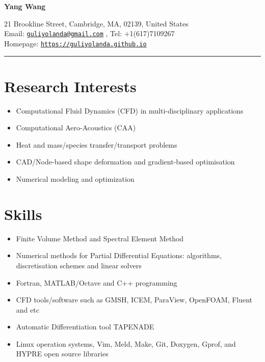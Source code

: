 \documentclass[letterpaper]{article}
\def\name{Yang Wang}
\begin{document}

\centerline{\LARGE \bf \name}


\begin{minipage}{\linewidth}
\begin{center}
21 Brookline Street, Cambridge, MA, 02139, United States\\
Email: \href{mailto:guliyolanda@gmail.com}{\tt guliyolanda@gmail.com} , Tel: +1(617)7109267 \\
Homepage:  \href{https://guliyolanda.github.io}{\tt https://guliyolanda.github.io} \\
\end{center}
\end{minipage}

\vspace{0pt}
\rule{\textwidth}{1pt}

\vspace{-12pt}
\section*{Research Interests}
\vspace{-10pt}
\begin{itemize}
\item Computational Fluid Dynamics (CFD) in multi-disciplinary applications
\item Computational Aero-Acoustics (CAA)
\item Heat and mass/species transfer/transport problems
\item CAD/Node-based shape deformation and gradient-based optimisation
\item Numerical modeling and optimization
\end{itemize} 

\vspace{-12pt}
\section*{Skills}
\vspace{-10pt}
\begin{itemize}
\item Finite Volume Method and Spectral Element Method
\item Numerical methods for Partial Differential Equations: algorithms, discretisation schemes and linear solvers
\item Fortran, MATLAB/Octave and C++ programming
\item CFD tools/software such as GMSH, ICEM, ParaView, OpenFOAM, Fluent and etc
\item Automatic Differentiation tool TAPENADE
\item Linux operation systems, Vim, Meld, Make, Git, Doxygen, Gprof, and HYPRE open source libraries 
\end{itemize}
\end{document}
